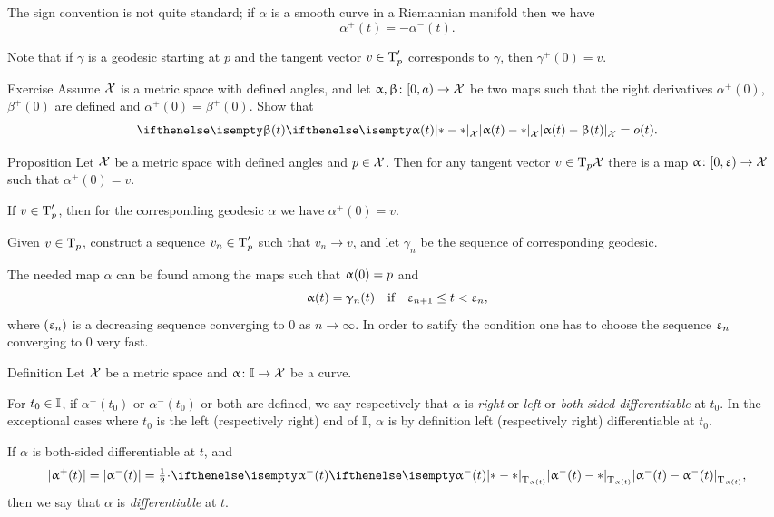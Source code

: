 The sign convention is not quite standard; if $\alpha$ is a smooth curve in a Riemannian manifold then we have
\[\alpha^+(t)=-\alpha^-(t).\]

Note that if $\gamma$ is a geodesic starting at $p$ 
and the tangent vector $v\in\T_p'$ corresponds to $\gamma$, 
then $\gamma^+(0)=v$.

\begin{thm}{Exercise}\label{ex:tangent-vect=o(t)}
Assume $\mathcal{X}$ is a metric space with defined angles,
and let $\alpha,\beta\:[0,a)\to\spc{X}$ 
be two maps such that the right derivatives $\alpha^+(0)$, $\beta^+(0)$ are defined and $\alpha^+(0)=\beta^+(0)$.
Show that
\[\dist{\alpha(t)}{\beta(t)}{\spc{X}}=o(t).\]
\end{thm}

\begin{thm}{Proposition}
Let $\mathcal{X}$ be a metric space with defined angles and $p\in \spc{X}$.
Then for any tangent vector $v\in\T_p\spc{X}$ there is a map $\alpha\:[0,\eps)\to \spc{X}$ such that $\alpha^+(0)=v$.
\end{thm}

If $v\in \T_p'$, then for the corresponding geodesic $\alpha$ we have $\alpha^+(0)=v$.

Given $v\in \T_p$, construct a sequence $v_n\in\T'_p$ 
such that $v_n\to v$, and let $\gamma_n$ be the sequence of corresponding geodesic.

The needed map $\alpha$ can be found among the maps such that $\alpha(0)\z=p$ and
\[\alpha(t)=\gamma_n(t)\quad \text{if}\quad \eps_{n+1}\le t<\eps_n,\]
where $(\upvarepsilon_n)$
is a decreasing sequence converging to $0$ as $n\to\infty$.
In order to satify the condition one has to choose the sequence $\upvarepsilon_n$ converging to $0$ very fast.
\qeds

\begin{thm}{Definition}\label{def:diff-curv}
Let 
$\mathcal{X}$ be a metric space 
and $\alpha\:\II\to \spc{X}$ be a curve.

For $t_0\in\II$, 
if $\alpha^+(t_0)$ or $\alpha^-(t_0)$ or both are defined,
we say respectively that $\alpha$ is \emph{right} or \emph{left} or \emph{both-sided differentiable} at $t_0$.
In the exceptional cases where $t_0$ is the left (respectively right) end of $\mathbb{I}$, $\alpha$ is by definition left (respectively right) differentiable at $t_0$.

If $\alpha$ is both-sided differentiable at $t$, and 
\[|\alpha^+(t)|=|\alpha^-(t)|=\tfrac12\cdot\dist{\alpha^-(t)}{\alpha^-(t)}{\T_{\alpha(t)}},\] then we say that $\alpha$ is \emph{differentiable} at $t$.
\end{thm}

